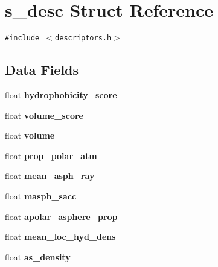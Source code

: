 \hypertarget{structs__desc}{
\section{s\_\-desc Struct Reference}
\label{structs__desc}
}
{\tt \#include $<$descriptors.h$>$}

\subsection*{Data Fields}
\begin{CompactItemize}
\item 
\hypertarget{structs__desc_ec451be95312187f418e20b87ebc0c1c}{
float \textbf{hydrophobicity\_\-score}}
\label{structs__desc_ec451be95312187f418e20b87ebc0c1c}

\item 
\hypertarget{structs__desc_0bf245c3d85f2fc8dec41d560313588a}{
float \textbf{volume\_\-score}}
\label{structs__desc_0bf245c3d85f2fc8dec41d560313588a}

\item 
\hypertarget{structs__desc_ec106f2a35f5676a6af920311aa4260e}{
float \textbf{volume}}
\label{structs__desc_ec106f2a35f5676a6af920311aa4260e}

\item 
\hypertarget{structs__desc_6363a7adfb5bc485f3524b8d4f0b5326}{
float \textbf{prop\_\-polar\_\-atm}}
\label{structs__desc_6363a7adfb5bc485f3524b8d4f0b5326}

\item 
\hypertarget{structs__desc_6e455ee4a61943b81a09fb9c4a816967}{
float \textbf{mean\_\-asph\_\-ray}}
\label{structs__desc_6e455ee4a61943b81a09fb9c4a816967}

\item 
\hypertarget{structs__desc_8d8c1b492a8f07602c496ffe907a7135}{
float \textbf{masph\_\-sacc}}
\label{structs__desc_8d8c1b492a8f07602c496ffe907a7135}

\item 
\hypertarget{structs__desc_1e842880419a0616060301b4eacf858f}{
float \textbf{apolar\_\-asphere\_\-prop}}
\label{structs__desc_1e842880419a0616060301b4eacf858f}

\item 
\hypertarget{structs__desc_b48b3533d79c147285ca50eabc12ef63}{
float \textbf{mean\_\-loc\_\-hyd\_\-dens}}
\label{structs__desc_b48b3533d79c147285ca50eabc12ef63}

\item 
\hypertarget{structs__desc_2aeb19cfc5f53e2d22f1a2065ede1010}{
float \textbf{as\_\-density}}
\label{structs__desc_2aeb19cfc5f53e2d22f1a2065ede1010}


\end{CompactItemize}
